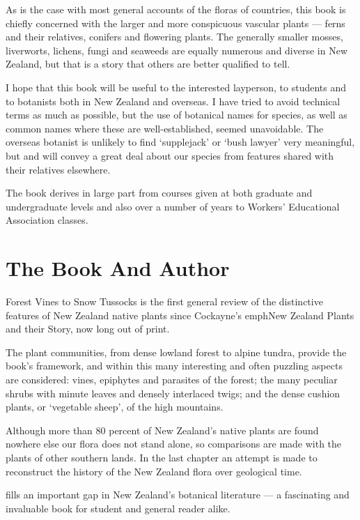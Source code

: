 As is the case with most general accounts of the floras of countries, this book is chiefly concerned with the larger and more conspicuous vascular plants --- ferns and their relatives, conifers and flowering plants. The generally smaller mosses, liverworts, lichens, fungi and seaweeds are equally numerous and diverse in New Zealand, but that is a story that others are better qualified to tell.

I hope that this book will be useful to the interested layperson, to students and to botanists both in New Zealand and overseas. I have tried to avoid technical terms as much as possible, but the use of botanical names for species, as well as common names where these are well-established, seemed unavoidable. The overseas botanist is unlikely to find `supplejack' or `bush lawyer' very meaningful, but  and  will convey a great deal about our species from features shared with their relatives elsewhere.

The book derives in large part from courses given at both graduate and undergraduate levels and also over a number of years to Workers' Educational Association classes.

\section*{The Book And Author}

Forest Vines to Snow Tussocks is the first general review of the distinctive features of New Zealand native plants since Cockayne's emph{New Zealand Plants and their Story}, now long out of print.

The plant communities, from dense lowland forest to alpine tundra, provide the book's framework, and within this many interesting and often puzzling aspects are considered: vines, epiphytes and parasites of the forest; the many peculiar shrubs with minute leaves and densely interlaced twigs; and the dense cushion plants, or `vegetable sheep', of the high mountains.

Although more than 80 percent of New Zealand's native plants are found nowhere else our flora does not stand alone, so comparisons are made with the plants of other southern lands.
In the last chapter an attempt is made to reconstruct the history of the New Zealand flora over geological time.

 fills an important gap in New Zealand's botanical literature — a fascinating and invaluable book for student and general reader alike.

